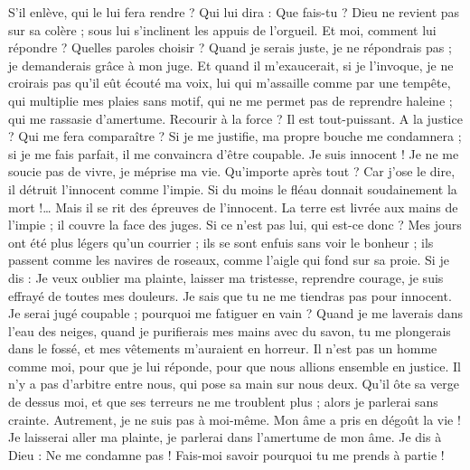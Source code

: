 \begin{multicols}{2}
S'il enlève, qui le lui fera rendre ? Qui lui dira : Que fais-tu ?
Dieu ne revient pas sur sa colère ; sous lui s'inclinent les appuis de l'orgueil.
Et moi, comment lui répondre ? Quelles paroles choisir ?
Quand je serais juste, je ne répondrais pas ; je demanderais grâce à mon juge.
Et quand il m'exaucerait, si je l'invoque, je ne croirais pas qu'il eût écouté ma voix,
lui qui m'assaille comme par une tempête, qui multiplie mes plaies sans motif,
qui ne me permet pas de reprendre haleine ; qui me rassasie d'amertume.
Recourir à la force ? Il est tout-puissant. A la justice ? Qui me fera comparaître ?
Si je me justifie, ma propre bouche me condamnera ; si je me fais parfait, il me convaincra d'être coupable.
Je suis innocent ! Je ne me soucie pas de vivre, je méprise ma vie.
Qu'importe après tout ? Car j'ose le dire, il détruit l'innocent comme l'impie.
Si du moins le fléau donnait soudainement la mort !… Mais il se rit des épreuves de l'innocent.
La terre est livrée aux mains de l'impie ; il couvre la face des juges. Si ce n'est pas lui, qui est-ce donc ?
Mes jours ont été plus légers qu'un courrier ; ils se sont enfuis sans voir le bonheur ;
ils passent comme les navires de roseaux, comme l'aigle qui fond sur sa proie.
Si je dis : Je veux oublier ma plainte, laisser ma tristesse, reprendre courage,
je suis effrayé de toutes mes douleurs. Je sais que tu ne me tiendras pas pour innocent.
Je serai jugé coupable ; pourquoi me fatiguer en vain ?
Quand je me laverais dans l'eau des neiges, quand je purifierais mes mains avec du savon,
tu me plongerais dans le fossé, et mes vêtements m'auraient en horreur.
Il n'est pas un homme comme moi, pour que je lui réponde, pour que nous allions ensemble en justice.
Il n'y a pas d'arbitre entre nous, qui pose sa main sur nous deux.
Qu'il ôte sa verge de dessus moi, et que ses terreurs ne me troublent plus ;
alors je parlerai sans crainte. Autrement, je ne suis pas à moi-même.
\VerseOne{}Mon âme a pris en dégoût la vie ! Je laisserai aller ma plainte, je parlerai dans l'amertume de mon âme.
Je dis à Dieu : Ne me condamne pas ! Fais-moi savoir pourquoi tu me prends à partie !

\end{multicols}
